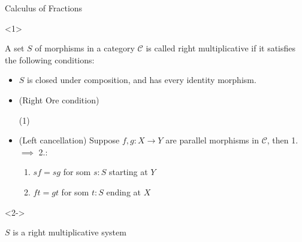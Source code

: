 \documentclass{beamer}
\begin{document}
            \begin{frame}{Calculus of Fractions}
                \begin{onlyenv}<1>
                    \begin{definition}
                        A set $S$ of morphisms in a category $\mathcal{C}$ is called right multiplicative if it satisfies the following conditions:
                        \begin{itemize}
                            \item $S$ is closed under composition, and has every identity morphism.
                            \item (Right Ore condition) 
                            \begin{flushleft}
                                (1)
                            \end{flushleft}
                            \item (Left cancellation) Suppose $f,g:X\rightarrow Y$ are parallel morphisms in $\mathcal{C}$, then 1. $\implies$ 2.:
                            \begin{enumerate}
                                \item $sf = sg$ for som $s:S$ starting at $Y$
                                \item $ft = gt$ for som $t:S$ ending at $X$
                            \end{enumerate}
                        \end{itemize}
                    \end{definition}
                \end{onlyenv}
                \begin{onlyenv}<2->
                    \begin{definition}
                        $S$ is a right multiplicative system
                        \begin{center}
\end{center}
\end{definition}
\end{onlyenv}
\end{frame}
\end{document}
